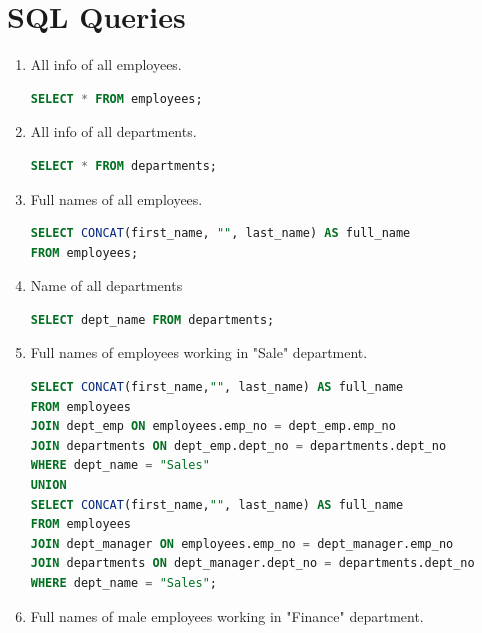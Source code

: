 \documentclass{article}
\begin{document}
\section*{SQL Queries}
\begin{enumerate}
	\item All info of all employees.\\
	
	\begin{lstlisting}[language=SQL]
SELECT * FROM employees;	
	\end{lstlisting}
	
	\item All info of all departments.\\
	
	\begin{lstlisting}[language=SQL]
SELECT * FROM departments;	
	\end{lstlisting}
	
	\item Full names of all employees.\\
	
	\begin{lstlisting}[language=SQL]
SELECT CONCAT(first_name, "", last_name) AS full_name
FROM employees;
	\end{lstlisting}
	
	\item Name of all departments\\
	
	\begin{lstlisting}[language=SQL]	
SELECT dept_name FROM departments;	
	\end{lstlisting}
	
	\item Full names of employees working in "Sale" department.\\
	
	\begin{lstlisting}[language=SQL]	
SELECT CONCAT(first_name,"", last_name) AS full_name
FROM employees
JOIN dept_emp ON employees.emp_no = dept_emp.emp_no
JOIN departments ON dept_emp.dept_no = departments.dept_no
WHERE dept_name = "Sales"
UNION
SELECT CONCAT(first_name,"", last_name) AS full_name
FROM employees
JOIN dept_manager ON employees.emp_no = dept_manager.emp_no
JOIN departments ON dept_manager.dept_no = departments.dept_no
WHERE dept_name = "Sales";
	\end{lstlisting}	
	
	\item Full names of male employees working in "Finance" department.\\
	

\end{enumerate}
\end{document}
